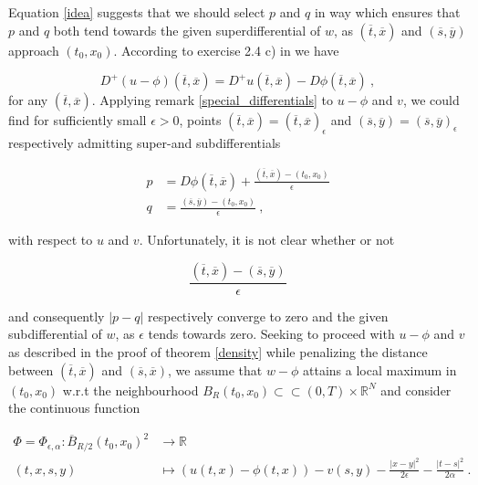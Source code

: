 		Equation \ref{idea} suggests that we should select $ p $ and $ q $ in way which ensures that $ p $ and $ q $ both tend towards the given superdifferential of $ w $, as $ (\overline{t}, \overline{x}) $ and $ (\overline{s}, \overline{y}) $ approach $ (t_0, x_0) $. According to exercise 2.4 c) in \cite[p.~49]{bardi2008optimal} we have
		
		\begin{equation*}
			D^{+}(u - \phi)(\overline{t}, \overline{x}) = D^{+}u(\overline{t}, \overline{x}) - D\phi(\overline{t}, \overline{x}) \ ,
		\end{equation*}
		 for any $ (\overline{t}, \overline{x}) $. Applying remark \ref{special_differentials} to $ u - \phi $ and $ v $, we could find for sufficiently small $ \epsilon > 0 $, points $ (\overline{t}, \overline{x}) = (\overline{t}, \overline{x})_{\epsilon} $ and $ (\overline{s}, \overline{y}) = (\overline{s}, \overline{y})_{\epsilon} $ respectively admitting super-and subdifferentials
		 
		 \begin{align*}
		 	p &= D\phi(\overline{t}, \overline{x}) +  \frac{(\overline{t}, \overline{x}) - (t_0, x_0)}{\epsilon} \\
		 	q &= \frac{(\overline{s}, \overline{y}) - (t_0, x_0)}{\epsilon} \ ,
		 \end{align*}
		 
		 with respect to $ u $ and $ v $. Unfortunately, it is not clear whether or not 
		 
		 \begin{equation*}
		 	\frac{(\overline{t}, \overline{x}) - (\overline{s}, \overline{y})}{\epsilon}
		 \end{equation*}
		 
		 and consequently $ \lvert p - q \rvert $ respectively converge to zero and the given subdifferential of $ w $, as $ \epsilon $ tends towards zero. Seeking to proceed with  $ u - \phi $ and $ v $ as described in the proof of theorem \ref{density} while penalizing the distance between $ (\overline{t}, \overline{x}) $ and $ (\overline{s}, \overline{x}) $, we assume that $ w - \phi $ attains a local maximum in $ (t_0, x_0) $ w.r.t the neighbourhood $ B_R(t_0, x_0) \subset \subset \left( 0, T \right) \times \mathbb{R}^N $ and consider the continuous function
		 
		 \begin{align*}
		 	\Phi = \Phi_{\epsilon, \alpha} :\overline{B} _{R / 2}(t_0, x_0)^2 &\to \mathbb{R} \\
		 	(t, x, s, y) &\mapsto (u(t, x) - \phi(t, x)) - v(s, y) - \frac{\lvert x - y \rvert^2 }{2 \epsilon} - \frac{\lvert t - s \rvert^2}{2 \alpha} \ .
		 \end{align*}
		 

